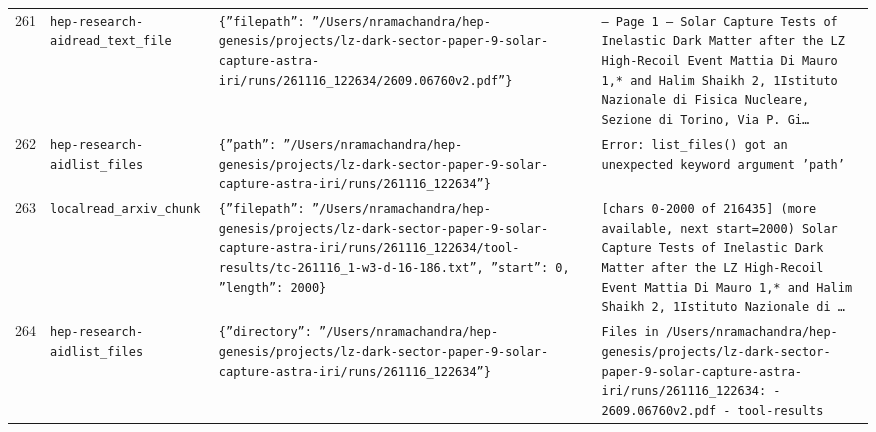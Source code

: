 \documentclass[11pt,a4paper]{article}
\begin{document}
\begin{longtable}{@{}p{}p{}p{}p{}@{}}
261 & \texttt{hep-research-aid}\newline\texttt{read\_\allowbreak{}text\_\allowbreak{}file} & \texttt{\{''filepath'':\allowbreak{} ''/\allowbreak{}Users/\allowbreak{}nramachandra/\allowbreak{}hep-genesis/\allowbreak{}projects/\allowbreak{}lz-dark-sector-paper-9-solar-capture-astra-iri/\allowbreak{}runs/\allowbreak{}261116\_\allowbreak{}122634/\allowbreak{}2609.06760v2.pdf''\}\allowbreak{}} & \texttt{--- Page 1 --- Solar Capture Tests of Inelastic Dark Matter after the LZ High-Recoil Event Mattia Di Mauro 1,\allowbreak{}* and Halim Shaikh 2,\allowbreak{}\dag{}\allowbreak{} 1Istituto Nazionale di Fisica Nucleare,\allowbreak{} Sezione di Torino,\allowbreak{} Via P. Gi\ldots{}\allowbreak{}} \\
262 & \texttt{hep-research-aid}\newline\texttt{list\_\allowbreak{}files} & \texttt{\{''path'':\allowbreak{} ''/\allowbreak{}Users/\allowbreak{}nramachandra/\allowbreak{}hep-genesis/\allowbreak{}projects/\allowbreak{}lz-dark-sector-paper-9-solar-capture-astra-iri/\allowbreak{}runs/\allowbreak{}261116\_\allowbreak{}122634''\}\allowbreak{}} & \texttt{Error:\allowbreak{} list\_\allowbreak{}files()\allowbreak{} got an unexpected keyword argument 'path'} \\
263 & \texttt{local}\newline\texttt{read\_\allowbreak{}arxiv\_\allowbreak{}chunk} & \texttt{\{''filepath'':\allowbreak{} ''/\allowbreak{}Users/\allowbreak{}nramachandra/\allowbreak{}hep-genesis/\allowbreak{}projects/\allowbreak{}lz-dark-sector-paper-9-solar-capture-astra-iri/\allowbreak{}runs/\allowbreak{}261116\_\allowbreak{}122634/\allowbreak{}tool-results/\allowbreak{}tc-261116\_\allowbreak{}1-w3-d-16-186.txt'',\allowbreak{} ''start'':\allowbreak{} 0,\allowbreak{} ''length'':\allowbreak{} 2000\}\allowbreak{}} & \texttt{[chars 0-2000 of 216435]\allowbreak{} (more available,\allowbreak{} next start=\allowbreak{}2000)\allowbreak{}  Solar Capture Tests of Inelastic Dark Matter after the LZ High-Recoil Event Mattia Di Mauro 1,\allowbreak{}* and Halim Shaikh 2,\allowbreak{}\dag{}\allowbreak{} 1Istituto Nazionale di \ldots{}\allowbreak{}} \\
264 & \texttt{hep-research-aid}\newline\texttt{list\_\allowbreak{}files} & \texttt{\{''directory'':\allowbreak{} ''/\allowbreak{}Users/\allowbreak{}nramachandra/\allowbreak{}hep-genesis/\allowbreak{}projects/\allowbreak{}lz-dark-sector-paper-9-solar-capture-astra-iri/\allowbreak{}runs/\allowbreak{}261116\_\allowbreak{}122634''\}\allowbreak{}} & \texttt{Files in /\allowbreak{}Users/\allowbreak{}nramachandra/\allowbreak{}hep-genesis/\allowbreak{}projects/\allowbreak{}lz-dark-sector-paper-9-solar-capture-astra-iri/\allowbreak{}runs/\allowbreak{}261116\_\allowbreak{}122634:\allowbreak{}   - 2609.06760v2.pdf   - tool-results} \\

\end{longtable}
\end{document}
